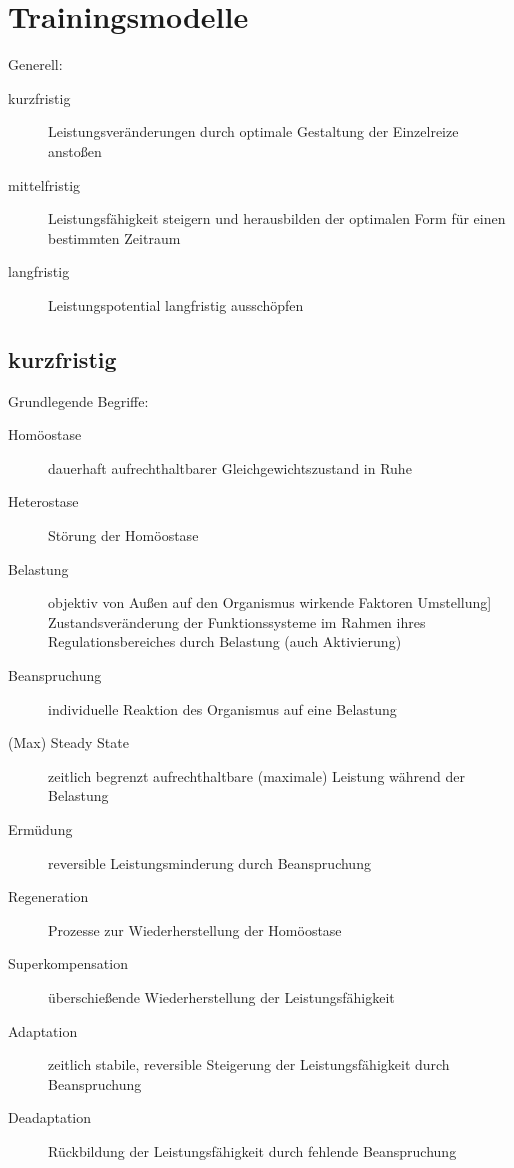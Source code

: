 
\section{Trainingsmodelle}

Generell:
\begin{description}
    \item[kurzfristig] Leistungsveränderungen durch optimale Gestaltung der Einzelreize anstoßen
    \item [mittelfristig] Leistungsfähigkeit steigern und herausbilden der optimalen Form für einen bestimmten Zeitraum
    \item [langfristig] Leistungspotential langfristig ausschöpfen
\end{description}

\subsection{kurzfristig}

Grundlegende Begriffe:
\begin{description}
    \item [Homöostase] dauerhaft aufrechthaltbarer Gleichgewichtszustand in Ruhe
    \item [Heterostase] Störung der Homöostase
    \item [Belastung] objektiv von Außen auf den Organismus wirkende Faktoren Umstellung] Zustandsveränderung der Funktionssysteme im Rahmen ihres Regulationsbereiches durch Belastung (auch Aktivierung)
    \item [Beanspruchung] individuelle Reaktion des Organismus auf eine Belastung
    \item [(Max) Steady State] zeitlich begrenzt aufrechthaltbare (maximale) Leistung während der Belastung
    \item [Ermüdung] reversible Leistungsminderung durch Beanspruchung
    \item [Regeneration] Prozesse zur Wiederherstellung der Homöostase
    \item [Superkompensation] überschießende Wiederherstellung der Leistungsfähigkeit
    \item [Adaptation] zeitlich stabile, reversible Steigerung der Leistungsfähigkeit durch Beanspruchung
    \item [Deadaptation] Rückbildung der Leistungsfähigkeit durch fehlende Beanspruchung
\end{description}
